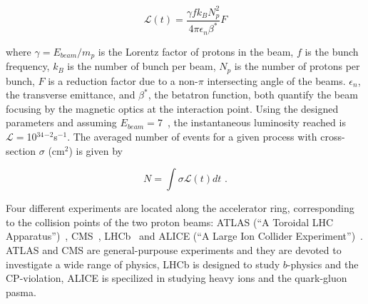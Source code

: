 \begin{equation}
    \mathcal{L}(t)=\frac{\gamma f k_B N^2_p}{4\pi \epsilon_n \beta^*} F
    \label{eq:INSTAlumi}
\end{equation} 

where $\gamma=E_{beam}/m_p$ is the Lorentz factor of protons in the beam, 
$f$ is the bunch frequency, $k_B$ is the number of bunch per beam, 
$N_p$ is the number of protons per bunch, $F$ is a reduction factor due
to a non-$\pi$ intersecting angle of the beams. $\epsilon_n$, the transverse emittance, and
$\beta^*$, the betatron function, both quantify the beam focusing by the magnetic optics
at the interaction point. Using the designed parameters and assuming $E_{beam}=$7~\tev,
the instantaneous luminosity reached is $\mathcal{L}=$10$^{34}$\cm$^{-2}$\si{s}$^{-1}$.
The averaged number of events for a given process with cross-section $\sigma$ (\si{cm}$^2$) is given by 

\begin{equation}
    N=\int \sigma \mathcal{L}(t) dt\mbox{ .}
    \label{eq:rate}
\end{equation} 

Four different experiments are located along the accelerator ring,
corresponding to the collision points of the two proton beams: ATLAS (``A Toroidal LHC Apparatus'')~\cite{Aad:2008zzm},
CMS~\cite{Chatrchyan:2008aa}, LHCb~\cite{Alves:2008zz} and ALICE (``A Large Ion Collider Experiment'')~\cite{Aamodt:2008zz}.
ATLAS and CMS are general-purpouse experiments and they are devoted to investigate a wide range of physics,
LHCb is designed to study $b$-physics and the CP-violation, ALICE is specilized in 
studying heavy ions and the quark-gluon pasma.

